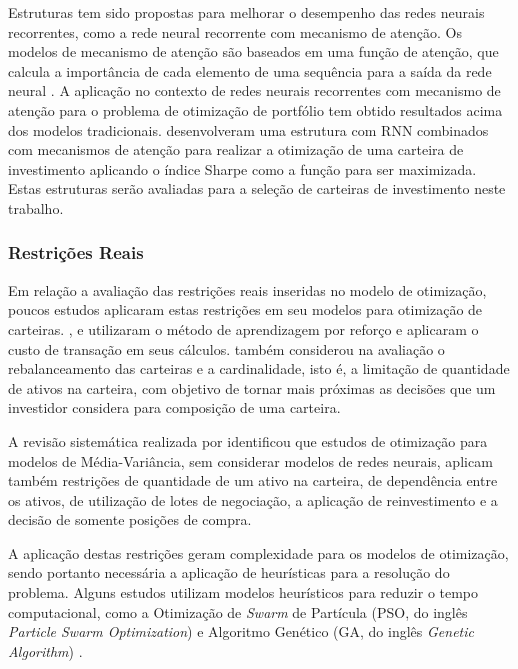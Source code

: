             \ipar Estruturas tem sido propostas para melhorar o desempenho das redes neurais recorrentes, como a rede neural recorrente com mecanismo de atenção. Os modelos de mecanismo de atenção são baseados em uma função de atenção, que calcula a importância de cada elemento de uma sequência para a saída da rede neural \cite{bahdanau2015neural}\cite{luong2015effective}\cite{vaswani2017attention}. A aplicação no contexto de redes neurais recorrentes com mecanismo de atenção para o problema de otimização de portfólio tem obtido resultados acima dos modelos tradicionais.  desenvolveram uma estrutura com \acrshort{RNN} combinados com mecanismos de atenção para realizar a otimização de uma carteira de investimento aplicando o índice Sharpe como a função para ser maximizada. Estas estruturas serão avaliadas para a seleção de carteiras de investimento neste trabalho.
        
        \subsubsection{Restrições Reais}
            
            \ipar Em relação a avaliação das restrições reais inseridas no modelo de otimização, poucos estudos aplicaram estas restrições em seu modelos para otimização de carteiras. ,  e  utilizaram o método de aprendizagem por reforço e aplicaram o custo de transação em seus cálculos.  também considerou na avaliação o rebalanceamento das carteiras e a cardinalidade, isto é, a limitação de quantidade de ativos na carteira, com objetivo de tornar mais próximas as decisões que um investidor considera para composição de uma carteira.

            \ipar A revisão sistemática realizada por  identificou que estudos de otimização para modelos de Média-Variância, sem considerar modelos de redes neurais, aplicam também restrições de quantidade de um ativo na carteira, de dependência entre os ativos, de utilização de lotes de negociação, a aplicação de reinvestimento e a decisão de somente posições de compra. 

            \ipar A aplicação destas restrições geram complexidade para os modelos de otimização, sendo portanto necessária a aplicação de heurísticas para a resolução do problema. Alguns estudos utilizam modelos heurísticos para reduzir o tempo computacional, como a Otimização de \textit{Swarm} de Partícula (\acrshort{PSO}, do inglês \textit{Particle Swarm Optimization}) e Algoritmo Genético (\acrshort{GA}, do inglês \textit{Genetic Algorithm}) \cite{maree2022balancing}\cite{jia2022policy}\cite{solares2022comprehensive}\cite{aithal2023real}.

